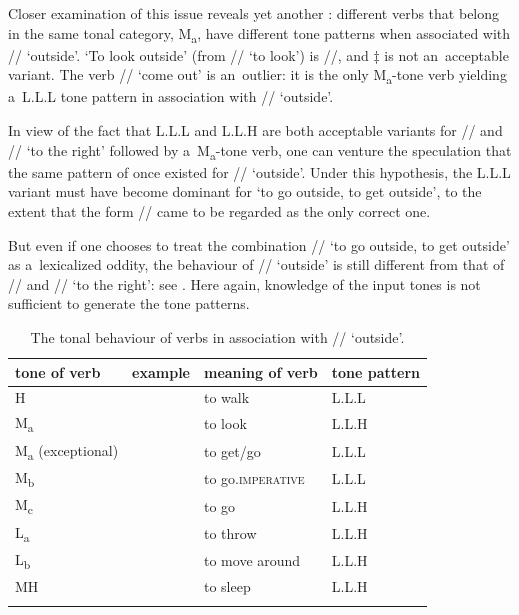   \largerpage
Closer examination of this issue reveals yet another : different verbs that belong in the same
tonal category, M\textsubscript{a}, have different tone patterns when associated with // ‘outside’. ‘To
look outside’ (from // ‘to look’) is //, and $\ddagger${\kern2pt} is not
an~acceptable variant. The verb // ‘come out’ is an~outlier: it is the only M\textsubscript{a}-tone verb
yielding a~L.L.L tone pattern in association with // ‘outside’.

In view of the fact that L.L.L and L.L.H are both acceptable variants for // and
// ‘to the right’ followed by a~M\textsubscript{a}-tone verb, one can venture the speculation that the
same pattern of  once existed for // ‘outside’. Under this hypothesis, the
L.L.L variant must have become dominant for ‘to go outside, to get outside’, to the extent that the form // came to be regarded as the only correct one. 

\newpage 
But even if one chooses to treat the combination // ‘to go outside, to get outside’ as a~lexicalized {oddity}, the behaviour of // ‘outside’ is still different from that of // and
// ‘to the right’: see . Here again, knowledge of the input tones is not sufficient to generate the tone patterns.

\begin{table}%
\caption{\label{tab:thetonalbehaviourofverbsinassociationwithoutside}The tonal behaviour of verbs in association with // ‘outside’.}
\begin{tabularx}{\textwidth}{ l@{\hspace{8mm}} l@{\hspace{8mm}} l@{\hspace{8mm}} Q }
\lsptoprule
	tone of verb & example & meaning of verb & tone pattern\\ \midrule
	H &  & to walk & L.L.L\\
	M\textsubscript{a} &  & to look & L.L.H\\
	M\textsubscript{a} (exceptional) &  & to get/go & L.L.L\\
	M\textsubscript{b} &  & to go.\textsc{imperative} & L.L.L\\
	M\textsubscript{c} &  & to go & L.L.H\\
	L\textsubscript{a} &  & to throw & L.L.H\\
	L\textsubscript{b} &  & to move around & L.L.H\\
	MH &  & to sleep & L.L.H\\
\lspbottomrule
\end{tabularx}
\end{table}



